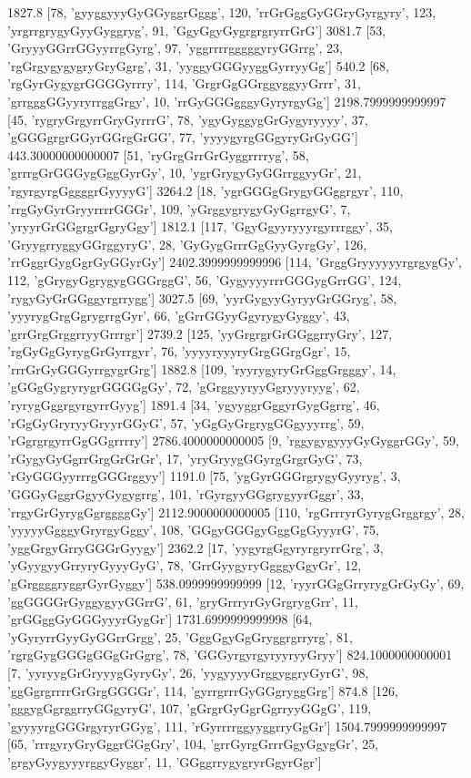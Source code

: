 1827.8 [78, 'gyyggyyyGyGGyggrGggg', 120, 'rrGrGggGyGGryGyrgyry', 123, 'yrgrrgrygyGyyGyggryg', 91, 'GgyGgyGygrgrgryrrGrG']
3081.7 [53, 'GryyyGGrrGGyyrrgGyrg', 97, 'yggrrrrgggggyryGGrrg', 23, 'rgGrgygygygryGryGgrg', 31, 'yyggyGGGyyggGyrryyGg']
540.2 [68, 'rgGyrGygygrGGGGyrrry', 114, 'GrgrGgGGrggyggyyGrrr', 31, 'grrgggGGyyryrrggGrgy', 10, 'rrGyGGGgggyGyryrgyGg']
2198.7999999999997 [45, 'rygryGrgyrrGryGyrrrG', 78, 'ygyGyggygGrGygyryyyy', 37, 'gGGGgrgrGGyrGGrgGrGG', 77, 'yyyygyrgGGgyryGrGyGG']
443.30000000000007 [51, 'ryGrgGrrGrGyggrrrryg', 58, 'grrrgGrGGGygGggGyrGy', 10, 'ygrGrygyGyGGrrggyyGr', 21, 'rgyrgyrgGggggrGyyyyG']
3264.2 [18, 'ygrGGGgGrygyGGggrgyr', 110, 'rrgGyGyrGryyrrrrGGGr', 109, 'yGrggygrygyGyGgrrgyG', 7, 'yryyrGrGGgrgrGgryGgy']
1812.1 [117, 'GgyGgyyryyyrgyrrrggy', 35, 'GryygrryggyGGrggyryG', 28, 'GyGygGrrrGgGyyGyrgGy', 126, 'rrGggrGygGgrGyGGyrGy']
2402.3999999999996 [114, 'GrggGryyyyyyrgrgygGy', 112, 'gGrygyGgrygygGGGrggG', 56, 'GygyyyyrrrGGGygGrrGG', 124, 'rygyGyGrGGggyrgrrygg']
3027.5 [69, 'yyrGygyyGyryyGrGGryg', 58, 'yyyrygGrgGgrygrrgGyr', 66, 'gGrrGGyyGgyrygyGyggy', 43, 'grrGrgGrggrryyGrrrgr']
2739.2 [125, 'yyGrgrgrGrGGggrryGry', 127, 'rgGyGgGyrygGrGyrrgyr', 76, 'yyyyryyyryGrgGGrgGgr', 15, 'rrrGrGyGGGyrrgygrGrg']
1882.8 [109, 'ryyrygyryGrGggGrgggy', 14, 'gGGgGygryrygrGGGGgGy', 72, 'gGrggyyryyGgryyyryyg', 62, 'ryrygGggrgyrgyrrGyyg']
1891.4 [34, 'ygyyggrGggyrGygGgrrg', 46, 'rGgGyGryryyGryyrGGyG', 57, 'yGgGyGrgrygGGgyyyrrg', 59, 'rGgrgrgyrrGgGGgrrrry']
2786.4000000000005 [9, 'rggygygyyyGyGyggrGGy', 59, 'rGygyGyGgrrGrgGrGrGr', 17, 'yryGryygGGyrgGrgrGyG', 73, 'rGyGGGyyrrrgGGGrggyy']
1191.0 [75, 'ygGyrGGGrgrygyGyyryg', 3, 'GGGyGggrGgyyGygygrrg', 101, 'rGyrgyyGGgrygyyrGggr', 33, 'rrgyGrGyrygGgrggggGy']
2112.9000000000005 [110, 'rgGrrryrGyrygGrggrgy', 28, 'yyyyyGgggyGryrgyGggy', 108, 'GGgyGGGgyGggGgGyyyrG', 75, 'yggGrgyGrryGGGrGyygy']
2362.2 [17, 'yygyrgGgyryrgryrrGrg', 3, 'yGyygyyGrryryGyyyGyG', 78, 'GrrGyygyryGgggyGgyGr', 12, 'gGrggggryggrGyrGyggy']
538.0999999999999 [12, 'ryyrGGgGrryrygGrGyGy', 69, 'ggGGGGrGyggygyyGGrrG', 61, 'gryGrrryrGyGrgrygGrr', 11, 'grGGggGyGGGyyyrGygGr']
1731.6999999999998 [64, 'yGyryrrGyyGyGGrrGrgg', 25, 'GggGgyGgGryggrgrryrg', 81, 'rgrgGygGGGgGGgGrGgrg', 78, 'GGGyrgyrgyryyryyGryy']
824.1000000000001 [7, 'yyryygGrGryyygGyryGy', 26, 'yygyyyyGrggyggryGyrG', 98, 'ggGgrgrrrrGrGrgGGGGr', 114, 'gyrrgrrrGyGGgryggGrg']
874.8 [126, 'gggygGgrggrryGGgyryG', 107, 'gGrgrGyGgrGgrryyGGgG', 119, 'gyyyyrgGGGrgyryrGGyg', 111, 'rGyrrrrggyyggrryGgGr']
1504.7999999999997 [65, 'rrrgyryGryGggrGGgGry', 104, 'grrGyrgGrrrGgyGgygGr', 25, 'grgyGyygyyyrggyGyggr', 11, 'GGggrrygygryrGgyrGgr']
